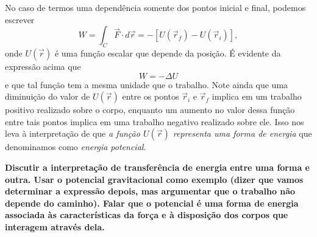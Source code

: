 No caso de termos uma dependência somente dos pontos inicial e final, podemos escrever
\begin{equation}\label{Eq:TrabForcaIndepCaminhoDefPotencial}
    W = \int_C \vec{F}\cdot d\vec{r} = -[U(\vec{r}_f) - U(\vec{r}_i)],
\end{equation}
%
onde $U(\vec{r})$ é uma função escalar que depende da posição. É evidente da expressão acima que
\begin{equation}
    W = - \Delta U
\end{equation}
%
e que tal função tem a mesma unidade que o trabalho. Note ainda que uma diminuição do valor de $U(\vec{r})$ entre os pontos $\vec{r}_i$ e $\vec{r}_f$ implica em um trabalho positivo realizado sobre o corpo, enquanto um aumento no valor dessa função entre tais pontos implica em uma trabalho negativo realizado sobre ele. Isso nos leva à interpretação de que \emph{a função $U(\vec{r})$ representa uma forma de energia} que denominamos como \emph{energia potencial}. 

\textbf{Discutir a interpretação de transferência de energia entre uma forma e outra. Usar o potencial gravitacional como exemplo (dizer que vamos determinar a expressão depois, mas argumentar que o trabalho não depende do caminho). Falar que o potencial é uma forma de energia associada às características da força e à disposição dos corpos que interagem através dela.}

